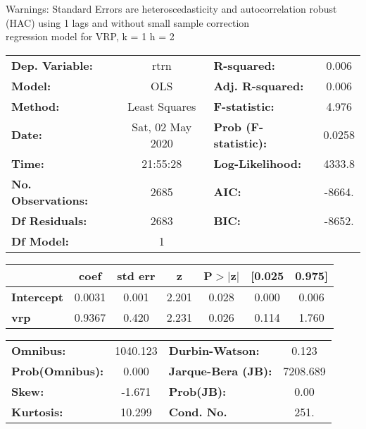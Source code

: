 Warnings: \newline
 [1] Standard Errors are heteroscedasticity and autocorrelation robust (HAC) using 1 lags and without small sample correction\\ 

regression model for VRP, k = 1 h = 2\begin{center}
\begin{tabular}{lclc}
\toprule
\textbf{Dep. Variable:}    &       rtrn       & \textbf{  R-squared:         } &     0.006   \\
\textbf{Model:}            &       OLS        & \textbf{  Adj. R-squared:    } &     0.006   \\
\textbf{Method:}           &  Least Squares   & \textbf{  F-statistic:       } &     4.976   \\
\textbf{Date:}             & Sat, 02 May 2020 & \textbf{  Prob (F-statistic):} &   0.0258    \\
\textbf{Time:}             &     21:55:28     & \textbf{  Log-Likelihood:    } &    4333.8   \\
\textbf{No. Observations:} &        2685      & \textbf{  AIC:               } &    -8664.   \\
\textbf{Df Residuals:}     &        2683      & \textbf{  BIC:               } &    -8652.   \\
\textbf{Df Model:}         &           1      & \textbf{                     } &             \\
\bottomrule
\end{tabular}
\begin{tabular}{lcccccc}
                   & \textbf{coef} & \textbf{std err} & \textbf{z} & \textbf{P$> |$z$|$} & \textbf{[0.025} & \textbf{0.975]}  \\
\midrule
\textbf{Intercept} &       0.0031  &        0.001     &     2.201  &         0.028        &        0.000    &        0.006     \\
\textbf{vrp}       &       0.9367  &        0.420     &     2.231  &         0.026        &        0.114    &        1.760     \\
\bottomrule
\end{tabular}
\begin{tabular}{lclc}
\textbf{Omnibus:}       & 1040.123 & \textbf{  Durbin-Watson:     } &    0.123  \\
\textbf{Prob(Omnibus):} &   0.000  & \textbf{  Jarque-Bera (JB):  } & 7208.689  \\
\textbf{Skew:}          &  -1.671  & \textbf{  Prob(JB):          } &     0.00  \\
\textbf{Kurtosis:}      &  10.299  & \textbf{  Cond. No.          } &     251.  \\
\bottomrule
\end{tabular}
\end{center}

